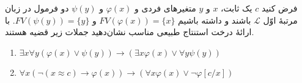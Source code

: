 فرض کنید $c$ یک ثابت، $x$ و $y$ متغیرهای فردی و $\varphi(x)$ و $\psi(y)$ دو فرمول در زبان مرتبهٔ اوّل $\mathcal{L}$ باشند و داشته باشیم $FV(\varphi(x)) = \{x\}$ و $FV(\psi(y)) = \{y\}$.  با ارائهٔ درخت استنتاج طبیعی مناسب نشان‌دهید جملات زیر قضیه هستند.
\begin{enumerate}[label=(\alph*)]
  \item $\exists x \forall y (\varphi(x) \vee \psi(y)) \to (\exists x \varphi(x) \vee \forall y \psi(y))$
  ~
  \item $\forall x (\neg (x \approx c) \to \varphi(x)) \to (\forall x \varphi(x) \vee \neg \varphi[c/x])$
  ~
\end{enumerate}